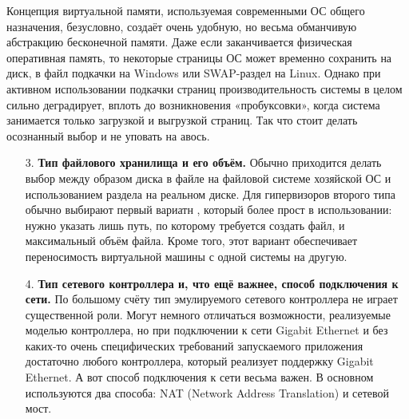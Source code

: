 \documentclass[14pt, a4paper]{article}
\begin{document}
\noindent Концепция виртуальной памяти, используемая современными ОС общего назначения, безусловно,
создаёт очень удобную, но весьма обманчивую абстракцию бесконечной памяти. Даже если
заканчивается физическая оперативная память, то некоторые страницы ОС может временно
сохранить на диск, в файл подкачки на Windows или SWAP-раздел на Linux. Однако при активном
использовании подкачки страниц производительность системы в целом сильно деградирует, вплоть до
возникновения «пробуксовки», когда система занимается только загрузкой и выгрузкой страниц. Так
что стоит делать осознанный выбор и не уповать на авось.
\vspace{0.3cm}
\begin{enumerate}
\item[3.] \textbf{Тип файлового хранилища и его объём.} Обычно приходится делать выбор между образом
диска в файле на файловой системе хозяйской ОС и использованием раздела на реальном
диске. Для гипервизоров второго типа обычно выбирают первый вариатн , который более прост
в использовании: нужно указать лишь путь, по которому требуется создать файл, и
максимальный объём файла. Кроме того, этот вариант обеспечивает переносимость
виртуальной машины с одной системы на другую.

\item[4.] \textbf{Тип сетевого контроллера и, что ещё важнее, способ подключения к сети.} По большому
счёту тип эмулируемого сетевого контроллера не играет существенной роли. Могут немного
отличаться возможности, реализуемые моделью контроллера, но при подключении к сети
Gigabit Ethernet и без каких-то очень специфических требований запускаемого приложения
достаточно любого контроллера, который реализует поддержку Gigabit Ethernet. А вот способ
подключения к сети весьма важен. В основном используются два способа: NAT (Network
Address Translation) и сетевой мост.


\end{enumerate}
\end{document}
